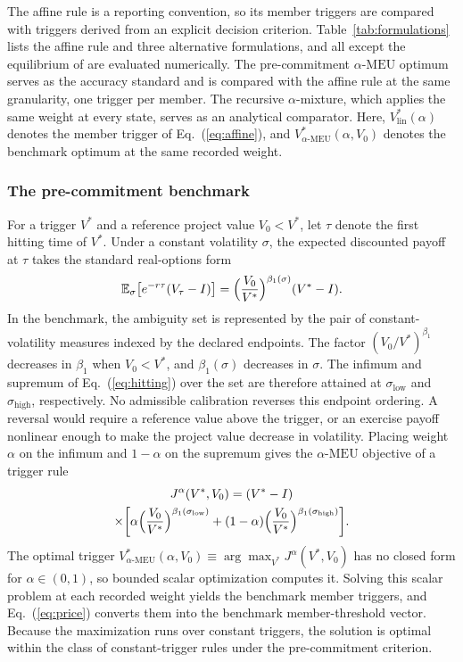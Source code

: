 \documentclass[5p,times,authoryear]{elsarticle}
\theoremstyle{plain}
\newcommand{\Vlin}{V^{*}_{\mathrm{lin}}}
\newcommand{\VMEU}{V^{*}_{\alpha\text{-MEU}}}
\newcommand{\slow}{\sigma_{\mathrm{low}}}
\newcommand{\shigh}{\sigma_{\mathrm{high}}}
\newcommand{\aMEU}{\alpha\text{-MEU}}
\begin{document}
The affine rule is a reporting convention, so its member triggers are compared with triggers derived from an explicit decision criterion. Table~\ref{tab:formulations} lists the affine rule and three alternative formulations, and all except the equilibrium of \citet{HuangYu2021} are evaluated numerically. The pre-commitment $\aMEU$ optimum serves as the accuracy standard and is compared with the affine rule at the same granularity, one trigger per member. The recursive $\alpha$-mixture, which applies the same weight at every state, serves as an analytical comparator. Here, $\Vlin(\alpha)$ denotes the member trigger of Eq.~(\ref{eq:affine}), and $\VMEU(\alpha,V_0)$ denotes the benchmark optimum at the same recorded weight.

\subsubsection{The pre-commitment benchmark}

For a trigger $V^{*}$ and a reference project value $V_0<V^{*}$, let $\tau$ denote the first hitting time of $V^{*}$. Under a constant volatility $\sigma$, the expected discounted payoff at $\tau$ takes the standard real-options form
\begin{equation}
\mathbb{E}_{\sigma}\bigl[e^{-r\tau}(V_{\tau}-I)\bigr]=\Bigl(\frac{V_0}{V^{*}}\Bigr)^{\beta_1(\sigma)}(V^{*}-I).
\label{eq:hitting}
\end{equation}
In the benchmark, the ambiguity set is represented by the pair of constant-volatility measures indexed by the declared endpoints. The factor $(V_0/V^{*})^{\beta_1}$ decreases in $\beta_1$ when $V_0<V^{*}$, and $\beta_1(\sigma)$ decreases in $\sigma$. The infimum and supremum of Eq.~(\ref{eq:hitting}) over the set are therefore attained at $\slow$ and $\shigh$, respectively. No admissible calibration reverses this endpoint ordering. A reversal would require a reference value above the trigger, or an exercise payoff nonlinear enough to make the project value decrease in volatility. Placing weight $\alpha$ on the infimum and $1-\alpha$ on the supremum gives the $\aMEU$ objective of a trigger rule
\begin{multline}
J^{\alpha}(V^{*},V_0)=(V^{*}-I)\\
\times\biggl[\alpha\Bigl(\frac{V_0}{V^{*}}\Bigr)^{\beta_1(\slow)}+(1-\alpha)\Bigl(\frac{V_0}{V^{*}}\Bigr)^{\beta_1(\shigh)}\biggr].
\label{eq:Jalpha}
\end{multline}
The optimal trigger $\VMEU(\alpha,V_0)\equiv\arg\max_{V^{*}}J^{\alpha}(V^{*},V_0)$ has no closed form for $\alpha\in(0,1)$, so bounded scalar optimization computes it. Solving this scalar problem at each recorded weight yields the benchmark member triggers, and Eq.~(\ref{eq:price}) converts them into the benchmark member-threshold vector. Because the maximization runs over constant triggers, the solution is optimal within the class of constant-trigger rules under the pre-commitment criterion.
\end{document}

